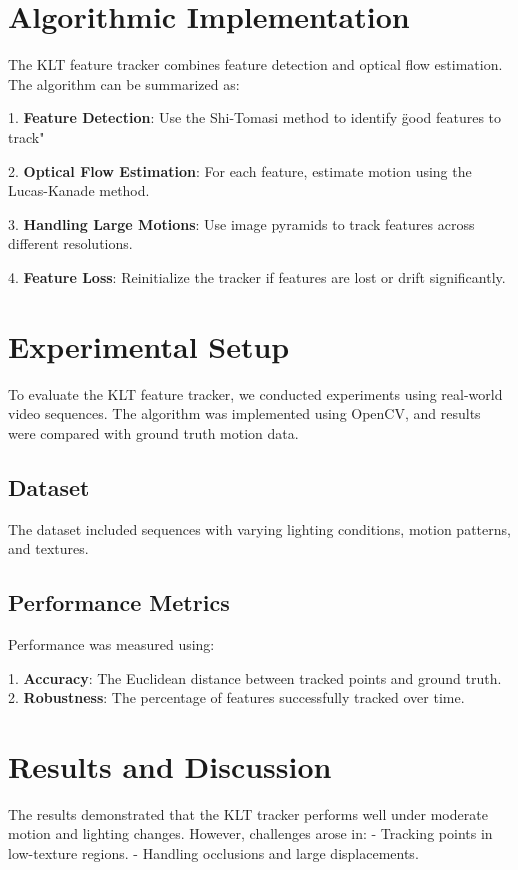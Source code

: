 \documentclass[10pt, conference, letterpaper]{IEEEtran}
\begin{document}
\section{Algorithmic Implementation}

The KLT feature tracker combines feature detection and optical flow estimation. The algorithm can be summarized as:

1. \textbf{Feature Detection}: Use the Shi-Tomasi method to identify \"good features to track"

2.  \textbf{Optical Flow Estimation}: For each feature, estimate motion using the Lucas-Kanade method.

3. \textbf{Handling Large Motions}: Use image pyramids to track features across different resolutions.

4. \textbf{Feature Loss}: Reinitialize the tracker if features are lost or drift significantly.

\section{Experimental Setup}

To evaluate the KLT feature tracker, we conducted experiments using real-world video sequences. The algorithm was implemented using OpenCV, and results were compared with ground truth motion data.

\subsection{Dataset}
The dataset included sequences with varying lighting conditions, motion patterns, and textures.

\subsection{Performance Metrics}
Performance was measured using:

1. \textbf{Accuracy}: The Euclidean distance between tracked points and ground truth.
2. \textbf{Robustness}: The percentage of features successfully tracked over time.

\section{Results and Discussion}

The results demonstrated that the KLT tracker performs well under moderate motion and lighting changes. However, challenges arose in:
- Tracking points in low-texture regions.
- Handling occlusions and large displacements.
\end{document}
